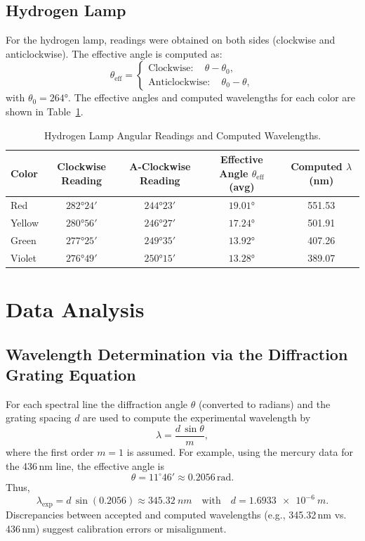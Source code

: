 \documentclass[12pt]{article}
\begin{document}
\subsection{Hydrogen Lamp}
For the hydrogen lamp, readings were obtained on both sides (clockwise and anticlockwise). The effective angle is computed as:
\[
\theta_{\text{eff}} = \begin{cases}
\text{Clockwise}: \quad \theta - \theta_0,\\[1mm]
\text{Anticlockwise}: \quad \theta_0 - \theta,
\end{cases}
\]
with \(\theta_0 = \ang{264}\). The effective angles and computed wavelengths for each color are shown in Table~\ref{tab:hydrogen}.

\begin{table}[H]
  \centering
  \caption{Hydrogen Lamp Angular Readings and Computed Wavelengths.}
  \begin{tabular}{lcccc}
    \toprule
    Color   & Clockwise Reading & A-Clockwise Reading & Effective Angle \(\theta_{\mathrm{eff}}\) (avg) & Computed \(\lambda\) (nm) \\
    \midrule
    Red     & \(\ang{282;24}\) & \(\ang{244;23}\) & \(\ang{19.01}\) & 551.53 \\
    Yellow  & \(\ang{280;56}\) & \(\ang{246;27}\) & \(\ang{17.24}\) & 501.91 \\
    Green   & \(\ang{277;25}\) & \(\ang{249;35}\) & \(\ang{13.92}\) & 407.26 \\
    Violet  & \(\ang{276;49}\) & \(\ang{250;15}\) & \(\ang{13.28}\) & 389.07 \\
    \bottomrule
  \end{tabular}
  \label{tab:hydrogen}
\end{table}

\section{Data Analysis}
\subsection{Wavelength Determination via the Diffraction Grating Equation}
For each spectral line the diffraction angle \(\theta\) (converted to radians) and the grating spacing \(d\) are used to compute the experimental wavelength by
\[
\lambda = \frac{d\,\sin\theta}{m},
\]
where the first order \(m=1\) is assumed. For example, using the mercury data for the 436\,nm line, the effective angle is
\[
\theta = 11^\circ46' \approx 0.2056 \, \text{rad}.
\]
Thus, 
\[
\lambda_{\text{exp}} = d\,\sin(0.2056) \approx \SI{345.32}{nm} \quad \text{with} \quad d = \SI{1.6933e-6}{m}.
\]
Discrepancies between accepted and computed wavelengths (e.g., 345.32\,nm vs. 436\,nm) suggest calibration errors or misalignment.
\end{document}
